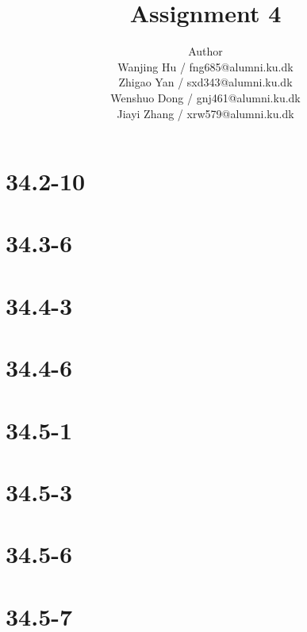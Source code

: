 \documentclass[12pt]{article}
\title{Assignment 4}
\author{Author \\
  Wanjing Hu / fng685@alumni.ku.dk  \\
  Zhigao Yan / sxd343@alumni.ku.dk  \\
  Wenshuo Dong / gnj461@alumni.ku.dk  \\
  Jiayi Zhang / xrw579@alumni.ku.dk \\
}
\begin{document}
\maketitle

\section{34.2-10}

\section{34.3-6}

\section{34.4-3}

\section{34.4-6}

\section{34.5-1}

\section{34.5-3}

\section{34.5-6}

\section{34.5-7}
\end{document}
